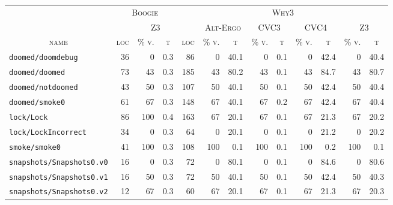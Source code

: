 \documentclass[a4paper,final]{llncs}
\newcommand{\Boogie}{Boogie\xspace}
\newcommand{\Why}{Why3\xspace}
\begin{document}
\begin{scriptsize}
\begin{longtable}{l |r *{1}{rr} |r *{4}{rr}}
\multicolumn{1}{c}{} &
\multicolumn{3}{c}{\textsc{\Boogie}} &
\multicolumn{9}{c}{\textsc{\Why}}
\\
\multicolumn{1}{c}{} &
\multicolumn{1}{c}{} &
\multicolumn{2}{c}{\textsc{Z3}} &
\multicolumn{1}{c}{} &
\multicolumn{2}{c}{\textsc{Alt-Ergo}} &
\multicolumn{2}{c}{\textsc{CVC3}} &
\multicolumn{2}{c}{\textsc{CVC4}} &
\multicolumn{2}{c}{\textsc{Z3}}
\\
\multicolumn{1}{c}{\textsc{name}} &
\multicolumn{1}{c}{\textsc{loc}} &
\multicolumn{1}{c}{\textsc{\% v.}} &
\multicolumn{1}{c}{\textsc{t}} &
\multicolumn{1}{c}{\textsc{loc}} &
\multicolumn{1}{c}{\textsc{\% v.}} &
\multicolumn{1}{c}{\textsc{t}} &
\multicolumn{1}{c}{\textsc{\% v.}} &
\multicolumn{1}{c}{\textsc{t}} &
\multicolumn{1}{c}{\textsc{\% v.}} &
\multicolumn{1}{c}{\textsc{t}} &
\multicolumn{1}{c}{\textsc{\% v.}} &
\multicolumn{1}{c}{\textsc{t}}
\\
\hline
\endhead
\verb|doomed/doomdebug|  &  36  &  0  &  0.3  &  86  &  0  &  40.1  &  0  &  0.1  &  0  &  42.4  &  0  &  40.4  \\
\verb|doomed/doomed|  &  73  &  43  &  0.3  &  185  &  43  &  80.2  &  43  &  0.1  &  43  &  84.7  &  43  &  80.7  \\
\verb|doomed/notdoomed|  &  43  &  50  &  0.3  &  107  &  50  &  40.1  &  50  &  0.1  &  50  &  42.4  &  50  &  40.4  \\
\verb|doomed/smoke0|  &  61  &  67  &  0.3  &  148  &  67  &  40.1  &  67  &  0.2  &  67  &  42.4  &  67  &  40.4  \\
\verb|lock/Lock|  &  86  &  100  &  0.4  &  163  &  67  &  20.1  &  67  &  0.1  &  67  &  21.3  &  67  &  20.2  \\
\verb|lock/LockIncorrect|  &  34  &  0  &  0.3  &  64  &  0  &  20.1  &  0  &  0.1  &  0  &  21.2  &  0  &  20.2  \\
\verb|smoke/smoke0|  &  41  &  100  &  0.3  &  108  &  100  &  0.1  &  100  &  0.1  &  100  &  0.2  &  100  &  0.1  \\
\verb|snapshots/Snapshots0.v0|  &  16  &  0  &  0.3  &  72  &  0  &  80.1  &  0  &  0.1  &  0  &  84.6  &  0  &  80.6  \\
\verb|snapshots/Snapshots0.v1|  &  16  &  50  &  0.3  &  72  &  50  &  40.1  &  50  &  0.1  &  50  &  42.4  &  50  &  40.3  \\
\verb|snapshots/Snapshots0.v2|  &  12  &  67  &  0.3  &  60  &  67  &  20.1  &  67  &  0.1  &  67  &  21.3  &  67  &  20.3  \\

\end{longtable}
\end{scriptsize}
\end{document}
